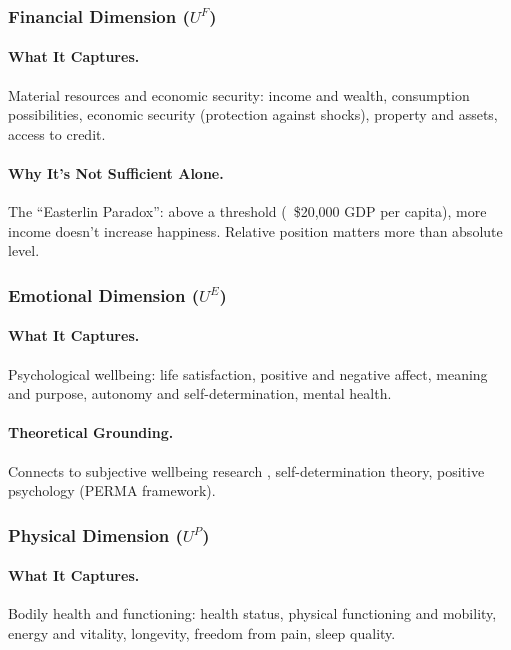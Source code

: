 \subsubsection{Financial Dimension ($U^F$)}

\paragraph{What It Captures.}
Material resources and economic security: income and wealth, consumption possibilities,
economic security (protection against shocks), property and assets, access to credit.

\paragraph{Why It's Not Sufficient Alone.}
The ``Easterlin Paradox'': above a threshold (~\$20,000 GDP per capita), more income 
doesn't increase happiness. Relative position matters more than absolute level.

\subsubsection{Emotional Dimension ($U^E$)}

\paragraph{What It Captures.}
Psychological wellbeing: life satisfaction, positive and negative affect, meaning and purpose,
autonomy and self-determination, mental health.

\paragraph{Theoretical Grounding.}
Connects to subjective wellbeing research \citep{diener1999}, self-determination theory,
positive psychology (PERMA framework).

\subsubsection{Physical Dimension ($U^P$)}

\paragraph{What It Captures.}
Bodily health and functioning: health status, physical functioning and mobility,
energy and vitality, longevity, freedom from pain, sleep quality.

